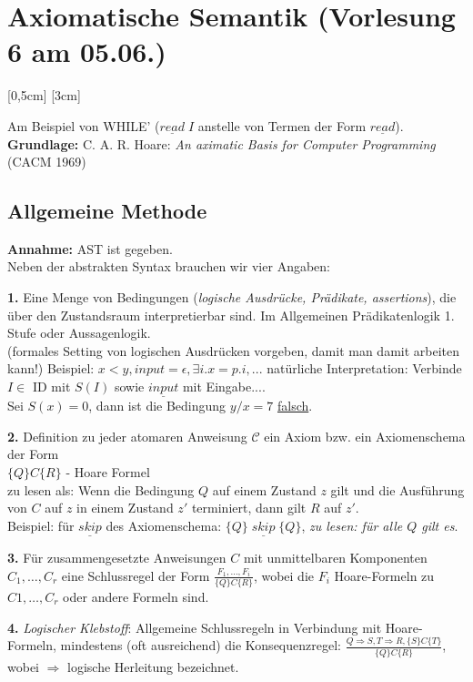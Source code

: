 \section{Axiomatische Semantik \small (Vorlesung 6 am 05.06.)}
[0,5cm]
[3cm]

Am Beispiel von WHILE' ($\underline{read}\;I$ anstelle von Termen der Form $\underline{read}$).\\
\textbf{Grundlage:} C. A. R. Hoare: \emph{An aximatic Basis for Computer Programming} (CACM 1969)
\subsection{Allgemeine Methode}
\textbf{Annahme:} AST ist gegeben.\\
Neben der abstrakten Syntax brauchen wir vier Angaben:
\begin{compactitem}
	\item[\textbf{1.}] Eine Menge von Bedingungen (\emph{logische Ausdrücke, Prädikate, assertions}), die über den Zustandsraum interpretierbar sind. Im Allgemeinen Prädikatenlogik 1. Stufe oder Aussagenlogik.\\
	(formales Setting von logischen Ausdrücken vorgeben, damit man damit arbeiten kann!)
	Beispiel: $x < y, input = \epsilon, \exists i.x=p.i, ...$ 
	natürliche Interpretation: Verbinde $I \in$ ID mit $S(I)$ sowie $\underline{input}$ mit Eingabe....\\
	Sei $S(x)=0$, dann ist die Bedingung $y/x=7$ \underline{falsch}.\\
	\item[\textbf{2.}] Definition zu jeder atomaren Anweisung $\mathcal{C}$ ein Axiom bzw. ein Axiomenschema der Form\\
	$\{Q\}C\{R\}$ - Hoare Formel\\
	zu lesen als: Wenn die Bedingung $Q$ auf einem Zustand $z$ gilt und die Ausführung von $C$ auf $z$ in einem Zustand $z'$ terminiert, dann gilt $R$ auf $z'$.\\
	Beispiel: für $\underline{skip}$ des Axiomenschema: $\{Q\}\;\underline{skip}\;\{Q\}$, \emph{zu lesen: für alle $Q$ gilt es}.\\
	\item[\textbf{3.}] Für zusammengesetzte Anweisungen $C$ mit unmittelbaren Komponenten $C_1,\dots,C_r$ eine Schlussregel der Form $\frac{F_1,\dots,F_i}{\{Q\}C\{R\}}$, wobei die $F_i$ Hoare-Formeln zu $C1, \dots, C_r$ oder andere Formeln sind.\\
	\item[\textbf{4.}] \emph{Logischer Klebstoff}: Allgemeine Schlussregeln in Verbindung mit Hoare-Formeln, mindestens (oft ausreichend) die Konsequenzregel: $\frac{Q\Rightarrow S, T \Rightarrow R, \{S\}C\{T\}}{\{Q\}C\{R\}}$, wobei $\Rightarrow$ logische Herleitung bezeichnet.\\
\end{compactitem}
